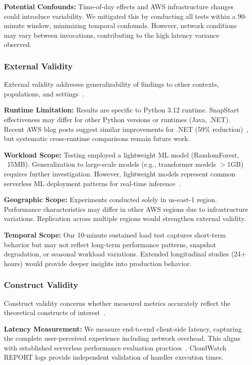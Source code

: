 \documentclass[conference]{IEEEtran}
\begin{document}
\textbf{Potential Confounds:} Time-of-day effects and AWS infrastructure changes could introduce variability. We mitigated this by conducting all tests within a 90-minute window, minimizing temporal confounds. However, network conditions may vary between invocations, contributing to the high latency variance observed.

\subsubsection{External Validity}
External validity addresses generalizability of findings to other contexts, populations, and settings~\cite{wohlin2012experimentation}.

\textbf{Runtime Limitation:} Results are specific to Python 3.12 runtime. SnapStart effectiveness may differ for other Python versions or runtimes (Java, .NET). Recent AWS blog posts suggest similar improvements for .NET (59\% reduction)~\cite{aws-snapstart-dotnet}, but systematic cross-runtime comparisons remain future work.

\textbf{Workload Scope:} Testing employed a lightweight ML model (RandomForest, ~15MB). Generalization to large-scale models (e.g., transformer models $>1$GB) requires further investigation. However, lightweight models represent common serverless ML deployment patterns for real-time inference~\cite{serverless-ml-deployment}.

\textbf{Geographic Scope:} Experiments conducted solely in us-east-1 region. Performance characteristics may differ in other AWS regions due to infrastructure variations. Replication across multiple regions would strengthen external validity.

\textbf{Temporal Scope:} Our 10-minute sustained load test captures short-term behavior but may not reflect long-term performance patterns, snapshot degradation, or seasonal workload variations. Extended longitudinal studies (24+ hours) would provide deeper insights into production behavior.

\subsubsection{Construct Validity}
Construct validity concerns whether measured metrics accurately reflect the theoretical constructs of interest~\cite{wohlin2012experimentation}.

\textbf{Latency Measurement:} We measure end-to-end client-side latency, capturing the complete user-perceived experience including network overhead. This aligns with established serverless performance evaluation practices~\cite{serverless-performance-survey}. CloudWatch REPORT logs provide independent validation of handler execution times.
\end{document}
